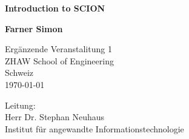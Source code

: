 \begin{titlepage}
    \thispagestyle{frontpage}
    \begin{center}

        \vspace*{3cm}
        
        \Huge
        \textbf{Introduction to SCION}
        
        \vspace{0.5cm}
        
        
        \vspace{1.5cm}
        
        \textbf{Farner Simon}

        \vfill

        \vfill

        \begin{minipage}[t]{0.4\textwidth}
        \normalsize
        Ergänzende Veranstalitung 1 \\
        ZHAW School of Engineering \\
        Schweiz\\
        \today
        \end{minipage}
        \begin{minipage}[t]{0.4\textwidth}
        \normalsize
        \raggedright
        Leitung:\\
        Herr Dr. Stephan Neuhaus \\
        Institut für angewandte Informations­technologie\\
        \end{minipage}

        
    \end{center}
\end{titlepage}
